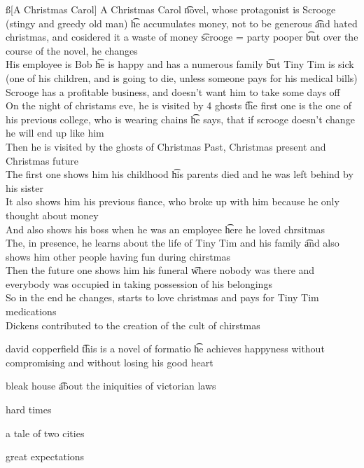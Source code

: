 \documentclass[12pt]{article}
\begin{document}
\ss[A Christmas Carol] 
A Christmas Carol \t novel, whose protagonist is Scrooge (stingy and greedy old man) \t he accumulates money, not to be generous \t and hated christmas, and cosidered it a waste of money \t scrooge = party pooper \t but over the course of the novel, he changes  \\
His employee is Bob \t he is happy and has a numerous family \t but Tiny Tim is sick (one of his children, and is going to die, unless someone pays for his medical bills) \\
Scrooge has a profitable business, and doesn't want him to take some days off \\
On the night of christams eve, he is visited by 4 ghosts \t the first one is the one of his previous college, who is wearing chains \t he says, that if scrooge doesn't change he will end up like him \\
Then he is visited by the ghosts of Christmas Past, Christmas present and Christmas future \\
The first one shows him his childhood \t his parents died and he was left behind by his sister \\
It also shows him his previous fiance, who broke up with him because he only thought about money \\
And also shows his boss when he was an employee \t here he loved chrsitmas \\
The, in presence, he learns about the life of Tiny Tim and his family \t and also shows him other people having fun during chirstmas \\
Then the future one shows him his funeral \t where nobody was there and everybody was occupied in taking possession of his belongings \\
So in the end he changes, starts to love christmas and pays for Tiny Tim medications \\
Dickens contributed to the creation of the cult of chirstmas 

\bi
    \item david copperfield \t this is a novel of formatio \t he achieves happyness without compromising and without losing his good heart
    \item bleak house \t about the iniquities of victorian laws
    \item hard times
    \item a tale of two cities
    \item great expectations
\ei
\end{document}
